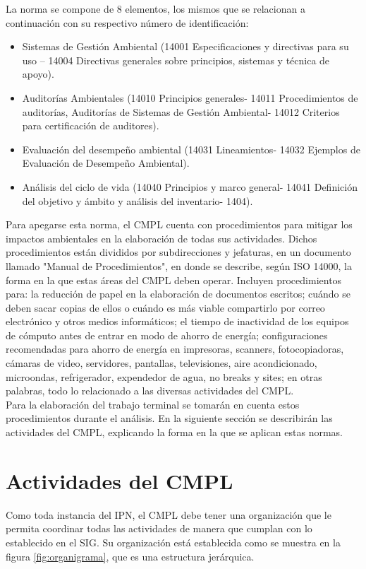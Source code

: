	La norma se compone de 8 elementos, los mismos que se relacionan a continuación con su respectivo número de identificación:\\
	
	\begin{itemize}
		\item Sistemas de Gestión Ambiental (14001 Especificaciones y directivas para su uso – 14004 Directivas generales sobre principios, sistemas y técnica de apoyo).
		\item Auditorías Ambientales (14010 Principios generales- 14011 Procedimientos de auditorías, Auditorías de Sistemas de Gestión Ambiental- 14012 Criterios para certificación de auditores).
		\item Evaluación del desempeño ambiental (14031 Lineamientos- 14032 Ejemplos de Evaluación de Desempeño Ambiental).
		\item Análisis del ciclo de vida (14040 Principios y marco general- 14041 Definición del objetivo y ámbito y análisis del inventario- 1404).
	\end{itemize}

	Para apegarse esta norma, el CMPL cuenta con procedimientos para mitigar los impactos ambientales en la elaboración de todas sus actividades. Dichos procedimientos están divididos por subdirecciones y jefaturas, en un documento llamado "Manual de Procedimientos", en donde se describe, según ISO 14000, la forma en la que estas áreas del CMPL deben operar. Incluyen procedimientos para: la reducción de papel en la elaboración de documentos escritos; cuándo se deben sacar copias de ellos o cuándo es más viable compartirlo por correo electrónico y otros medios informáticos; el tiempo de inactividad de los equipos de cómputo antes de entrar en modo de ahorro de energía; configuraciones recomendadas para ahorro de energía en impresoras, scanners, fotocopiadoras, cámaras de video, servidores, pantallas, televisiones, aire acondicionado, microondas, refrigerador, expendedor de agua, no breaks y sites; en otras palabras, todo lo relacionado a las diversas actividades del CMPL.\\
	
	Para la elaboración del trabajo terminal se tomarán en cuenta estos procedimientos durante el análisis. En la siguiente sección se describirán las actividades del CMPL, explicando la forma en la que se aplican estas normas.
	
\section{Actividades del CMPL}
	Como toda instancia del IPN, el CMPL debe tener una organización que le permita coordinar todas las actividades de manera que cumplan con lo establecido en el SIG. Su organización está establecida como se muestra en la figura \ref{fig:organigrama}, que es una estructura jerárquica.\\
	
